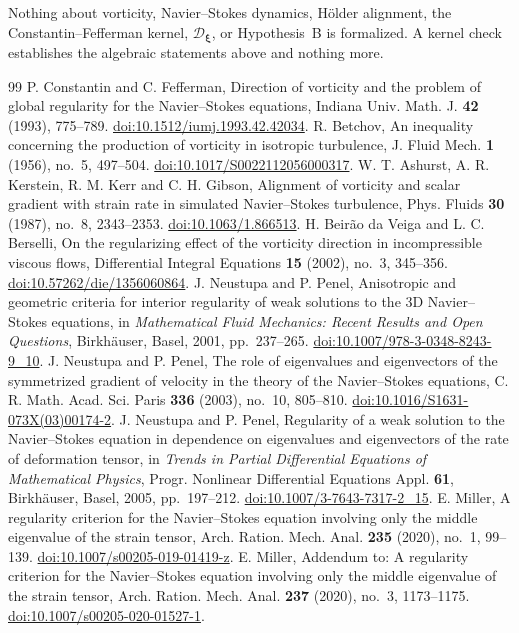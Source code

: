 \documentclass[11pt,a4paper]{article}
\begin{document}
Nothing about vorticity, Navier--Stokes dynamics, H\"older alignment, the Constantin--Fefferman kernel, \(\mathcal{D}_{\boldsymbol\xi}\), or Hypothesis~B is formalized. A kernel check establishes the algebraic statements above and nothing more.

\begin{thebibliography}{99}
 P. Constantin and C. Fefferman, Direction of vorticity and the problem of global regularity for the Navier--Stokes equations, Indiana Univ. Math. J. \textbf{42} (1993), 775--789. \href{https://doi.org/10.1512/iumj.1993.42.42034}{doi:10.1512/iumj.1993.42.42034}.
 R. Betchov, An inequality concerning the production of vorticity in isotropic turbulence, J. Fluid Mech. \textbf{1} (1956), no.~5, 497--504. \href{https://doi.org/10.1017/S0022112056000317}{doi:10.1017/S0022112056000317}.
 W. T. Ashurst, A. R. Kerstein, R. M. Kerr and C. H. Gibson, Alignment of vorticity and scalar gradient with strain rate in simulated Navier--Stokes turbulence, Phys. Fluids \textbf{30} (1987), no.~8, 2343--2353. \href{https://doi.org/10.1063/1.866513}{doi:10.1063/1.866513}.
 H. Beir\~ao da Veiga and L. C. Berselli, On the regularizing effect of the vorticity direction in incompressible viscous flows, Differential Integral Equations \textbf{15} (2002), no.~3, 345--356. \href{https://doi.org/10.57262/die/1356060864}{doi:10.57262/die/1356060864}.
 J. Neustupa and P. Penel, Anisotropic and geometric criteria for interior regularity of weak solutions to the 3D Navier--Stokes equations, in \emph{Mathematical Fluid Mechanics: Recent Results and Open Questions}, Birkh\"auser, Basel, 2001, pp.~237--265. \href{https://doi.org/10.1007/978-3-0348-8243-9_10}{doi:10.1007/978-3-0348-8243-9\_10}.
 J. Neustupa and P. Penel, The role of eigenvalues and eigenvectors of the symmetrized gradient of velocity in the theory of the Navier--Stokes equations, C. R. Math. Acad. Sci. Paris \textbf{336} (2003), no.~10, 805--810. \href{https://doi.org/10.1016/S1631-073X(03)00174-2}{doi:10.1016/S1631-073X(03)00174-2}.
 J. Neustupa and P. Penel, Regularity of a weak solution to the Navier--Stokes equation in dependence on eigenvalues and eigenvectors of the rate of deformation tensor, in \emph{Trends in Partial Differential Equations of Mathematical Physics}, Progr. Nonlinear Differential Equations Appl. \textbf{61}, Birkh\"auser, Basel, 2005, pp.~197--212. \href{https://doi.org/10.1007/3-7643-7317-2_15}{doi:10.1007/3-7643-7317-2\_15}.
 E. Miller, A regularity criterion for the Navier--Stokes equation involving only the middle eigenvalue of the strain tensor, Arch. Ration. Mech. Anal. \textbf{235} (2020), no.~1, 99--139. \href{https://doi.org/10.1007/s00205-019-01419-z}{doi:10.1007/s00205-019-01419-z}.
 E. Miller, Addendum to: A regularity criterion for the Navier--Stokes equation involving only the middle eigenvalue of the strain tensor, Arch. Ration. Mech. Anal. \textbf{237} (2020), no.~3, 1173--1175. \href{https://doi.org/10.1007/s00205-020-01527-1}{doi:10.1007/s00205-020-01527-1}.
\end{thebibliography}
\end{document}
